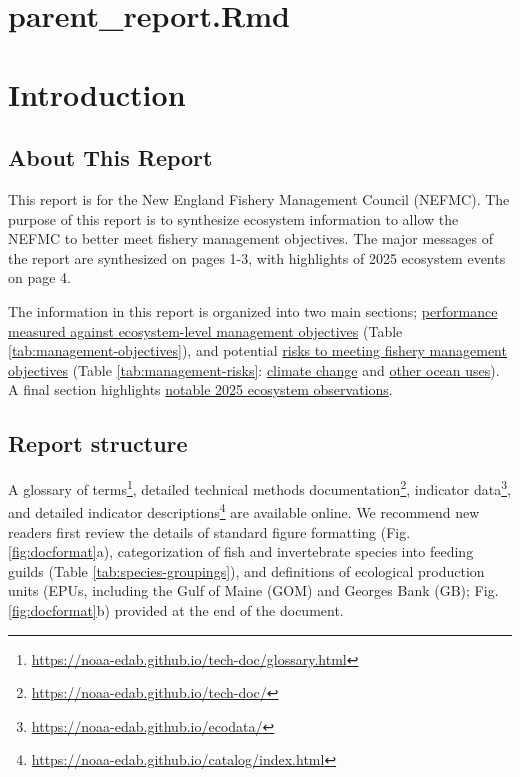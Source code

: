 \documentclass[
  10pt,
]{article}
\author{}
\date{\vspace{-2.5em}}
\begin{document}
\section{parent\_report.Rmd}\label{parent_report.rmd}

\setcounter{page}{4}
\thispagestyle{fancy}

\section{Introduction}\label{introduction}

\subsection{About This Report}\label{about-this-report}

This report is for the New England Fishery Management Council (NEFMC). The purpose of this report is to synthesize ecosystem information to allow the NEFMC to better meet fishery management objectives. The major messages of the report are synthesized on pages 1-3, with highlights of 2025 ecosystem events on page 4.

The information in this report is organized into two main sections; \hyperref[performance-relative-to-fishery-management-objectives]{performance measured against ecosystem-level management objectives} (Table \ref{tab:management-objectives}), and potential \hyperref[risks-to-meeting-fishery-management-objectives]{risks to meeting fishery management objectives} (Table \ref{tab:management-risks}: \hyperref[climate-and-ecosystem-change]{climate change} and \hyperref[other-ocean-uses-offshore-wind]{other ocean uses}). A final section highlights \hyperref[highlights]{notable 2025 ecosystem observations}.

\subsection{Report structure}\label{report-structure}

A glossary of terms\footnote{\url{https://noaa-edab.github.io/tech-doc/glossary.html}}, detailed technical methods documentation\footnote{\url{https://noaa-edab.github.io/tech-doc/}}, indicator data\footnote{\url{https://noaa-edab.github.io/ecodata/}}, and detailed indicator descriptions\footnote{\url{https://noaa-edab.github.io/catalog/index.html}} are available online. We recommend new readers first review the details of standard figure formatting (Fig. \ref{fig:docformat}a), categorization of fish and invertebrate species into feeding guilds (Table \ref{tab:species-groupings}), and definitions of ecological production units (EPUs, including the Gulf of Maine (GOM) and Georges Bank (GB); Fig. \ref{fig:docformat}b) provided at the end of the document.
\end{document}
